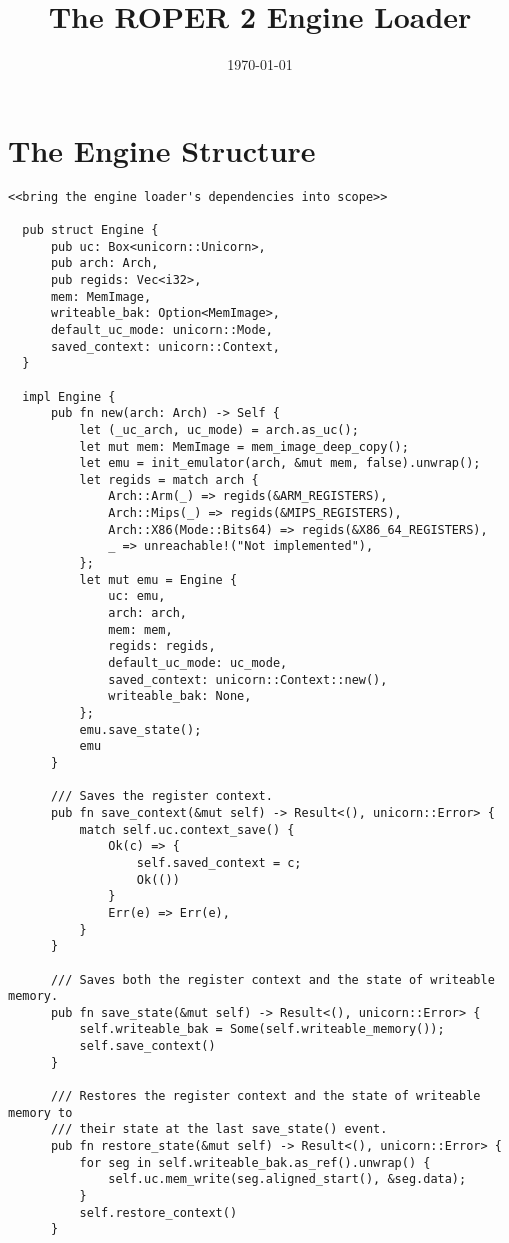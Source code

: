 \documentclass[11pt]{article}
\date{\today}
\title{The ROPER 2 Engine Loader}
\begin{document}
\maketitle
\tableofcontents



\section{The Engine Structure}
\label{sec:org03eea0a}

\lstset{language=rust,label=orgae964a3,caption= ,captionpos=b,numbers=none}
\begin{lstlisting}
<<bring the engine loader's dependencies into scope>>

  pub struct Engine {
      pub uc: Box<unicorn::Unicorn>,
      pub arch: Arch,
      pub regids: Vec<i32>,
      mem: MemImage,
      writeable_bak: Option<MemImage>,
      default_uc_mode: unicorn::Mode,
      saved_context: unicorn::Context,
  }

  impl Engine {
      pub fn new(arch: Arch) -> Self {
          let (_uc_arch, uc_mode) = arch.as_uc();
          let mut mem: MemImage = mem_image_deep_copy();
          let emu = init_emulator(arch, &mut mem, false).unwrap();
          let regids = match arch {
              Arch::Arm(_) => regids(&ARM_REGISTERS),
              Arch::Mips(_) => regids(&MIPS_REGISTERS),
              Arch::X86(Mode::Bits64) => regids(&X86_64_REGISTERS),
              _ => unreachable!("Not implemented"),
          };
          let mut emu = Engine {
              uc: emu,
              arch: arch,
              mem: mem,
              regids: regids,
              default_uc_mode: uc_mode,
              saved_context: unicorn::Context::new(),
              writeable_bak: None,
          };
          emu.save_state();
          emu
      }

      /// Saves the register context.
      pub fn save_context(&mut self) -> Result<(), unicorn::Error> {
          match self.uc.context_save() {
              Ok(c) => {
                  self.saved_context = c;
                  Ok(())
              }
              Err(e) => Err(e),
          }
      }

      /// Saves both the register context and the state of writeable memory.
      pub fn save_state(&mut self) -> Result<(), unicorn::Error> {
          self.writeable_bak = Some(self.writeable_memory());
          self.save_context()
      }

      /// Restores the register context and the state of writeable memory to
      /// their state at the last save_state() event.
      pub fn restore_state(&mut self) -> Result<(), unicorn::Error> {
          for seg in self.writeable_bak.as_ref().unwrap() {
              self.uc.mem_write(seg.aligned_start(), &seg.data);
          }
          self.restore_context()
      }


\end{lstlisting}
\end{document}
